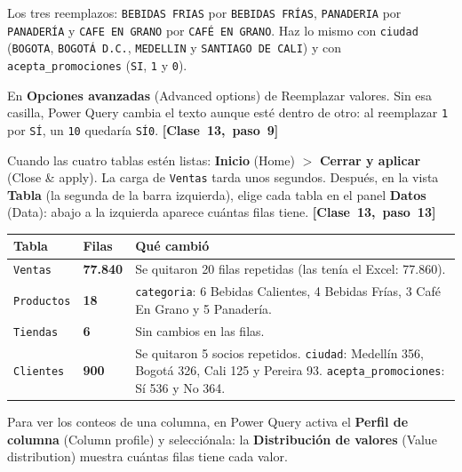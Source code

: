 \documentclass[11pt]{article}
\newcommand{\menu}[2]{\textbf{#1} {\color{black!55}(#2)}}
\newcommand{\vez}[1]{\leavevmode\mbox{\color{esumerTeal}\textbf{[#1]}}}
\newcommand{\subtitulo}[1]{\par\needspace{3\baselineskip}\vspace{4pt}{\large\bfseries\color{esumerNavyDark} #1}\par}
\begin{document}
\small Los tres reemplazos: \texttt{BEBIDAS FRIAS} por \texttt{BEBIDAS FRÍAS},
\texttt{PANADERIA} por \texttt{PANADERÍA} y \texttt{CAFE EN GRANO} por
\texttt{CAFÉ EN GRANO}. Haz lo mismo con \texttt{ciudad}
(\texttt{BOGOTA}, \texttt{BOGOTÁ D.C.}, \texttt{MEDELLIN} y
\texttt{SANTIAGO DE CALI}) y con \texttt{acepta\_promociones}
(\texttt{SI}, \texttt{1} y \texttt{0}).
\normalsize

\begin{cuidado}
\small En \menu{Opciones avanzadas}{Advanced options} de Reemplazar valores.
Sin esa casilla, Power Query cambia el texto aunque esté dentro de otro:
al reemplazar \texttt{1} por \texttt{SÍ}, un \texttt{10} quedaría
\texttt{SÍ0}. \vez{Clase 13, paso 9}
\end{cuidado}

\subtitulo{Cerrar y comprobar}

Cuando las cuatro tablas estén listas: \menu{Inicio}{Home} $>$
\menu{Cerrar y aplicar}{Close \& apply}. La carga de \texttt{Ventas} tarda
unos segundos. Después, en la vista \textbf{Tabla} (la segunda de la barra
izquierda), elige cada tabla en el panel \menu{Datos}{Data}: abajo a la
izquierda aparece cuántas filas tiene. \vez{Clase 13, paso 13}

\begin{control}
\small
\renewcommand{\arraystretch}{1.15}
\begin{tabularx}{\linewidth}{@{}>{\raggedright\arraybackslash}p{3.4cm} >{\raggedright\arraybackslash}p{3.1cm} >{\raggedright\arraybackslash}X@{}}
\toprule
\textbf{Tabla} & \textbf{Filas} & \textbf{Qué cambió}\\
\midrule
\texttt{Ventas} & \textbf{77.840} & Se quitaron 20 filas repetidas (las tenía el Excel: 77.860).\\
\texttt{Productos} & \textbf{18} & \texttt{categoria}: 6 Bebidas Calientes, 4 Bebidas Frías, 3 Café En Grano y 5 Panadería.\\
\texttt{Tiendas} & \textbf{6} & Sin cambios en las filas.\\
\texttt{Clientes} & \textbf{900} & Se quitaron 5 socios repetidos. \texttt{ciudad}: Medellín 356, Bogotá 326, Cali 125 y Pereira 93. \texttt{acepta\_promociones}: Sí 536 y No 364.\\
\bottomrule
\end{tabularx}
\end{control}

\vspace{2pt}
Para ver los conteos de una columna, en Power Query activa el
\menu{Perfil de columna}{Column profile} y selecciónala: la
\menu{Distribución de valores}{Value distribution} muestra cuántas filas
tiene cada valor.
\end{document}
